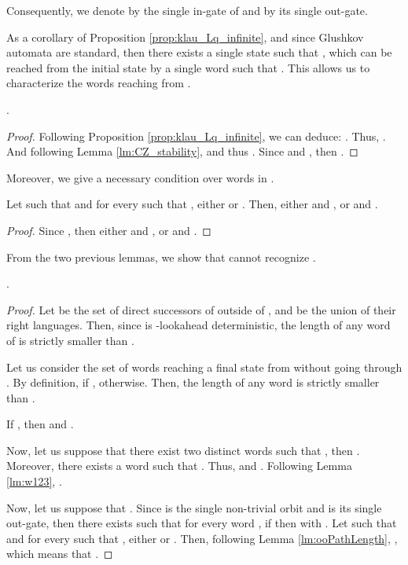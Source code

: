 \documentclass{llncs}
\begin{document}
	Consequently, we denote by  the single in-gate of  and by  its single out-gate.

	As a corollary of Proposition \ref{prop:klau_Lq_infinite}, and since Glushkov automata are standard, then there exists a single state  such that , which can be reached from the initial state by a single word  such that .
	This allows us to characterize the words reaching  from .

\begin{lemma}\label{lm:ooPathLength}
	.
\end{lemma}
\begin{proof}
	Following Proposition \ref{prop:klau_Lq_infinite}, we can deduce: .
	Thus, .
	And following Lemma \ref{lm:CZ_stability},  and thus .
	Since  and , then .
\end{proof}

	Moreover, we give a necessary condition over words in .

\begin{lemma}\label{lm:w123}
	Let  such that  and for every  such that , either  or .
	Then, either  and , or  and .
\end{lemma}
\begin{proof}
	Since , then either  and , or  and .
\end{proof}
	
	From the two previous lemmas, we show that  cannot recognize .
	
\begin{proposition}
	.
\end{proposition}
\begin{proof}
	Let  be the set of direct successors of  outside of , and  be the union of their right languages.
	Then, since  is -lookahead deterministic, the length of any word of  is strictly smaller than .
	
	Let us consider the set  of words reaching a final state from  without going through .
	By definition,  if ,  otherwise.
	Then, the length of any word  is strictly smaller than .
	
	If , then  and .
	
	Now, let us suppose that there exist two distinct words  such that , then .
	Moreover, there exists a word  such that .
	Thus,  and .
	Following Lemma \ref{lm:w123}, .
	
	Now, let us suppose that .
	Since  is the single non-trivial orbit and  is its single out-gate, then there exists  such that for every word , if  then  with .
	Let  such that  and for every  such that , either  or .
	Then, following Lemma \ref{lm:ooPathLength}, , which means that .
\end{proof}
\end{document}
